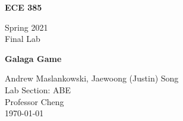 \begin{titlepage}
  \centering
  \vspace*{1cm}

  \Huge
  \textbf{ECE 385}

  \vspace{0.5cm}

  \LARGE
  Spring 2021 \\
  Final Lab

  \vspace{1.5cm}

  \textbf{Galaga Game}

  \vfill
  \vspace{0.8cm}

  \Large
  Andrew Maslankowski, Jaewoong (Justin) Song\\
  Lab Section: ABE\\
  Professor Cheng\\
  \today
\end{titlepage}
